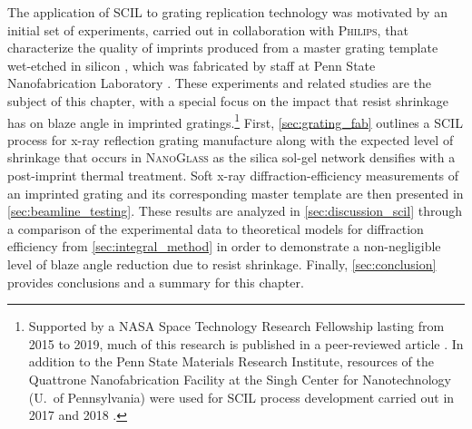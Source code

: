 The application of SCIL to grating replication technology was motivated by an initial set of experiments, carried out in collaboration with \textsc{Philips}, that characterize the quality of imprints produced from a master grating template wet-etched in silicon \cite{McCoy17}, which was fabricated by staff at Penn State Nanofabrication Laboratory \cite[\emph{cf.\@} \cref{sec:crystal_etching}]{Miles18,PSU_MRI_nanofab}. 
These experiments and related studies are the subject of this chapter, with a special focus on the impact that resist shrinkage has on blaze angle in imprinted gratings.\footnote{Supported by a NASA Space Technology Research Fellowship lasting from 2015 to 2019, much of this research is published in a peer-reviewed article \cite{McCoy20b}. In addition to the Penn State Materials Research Institute, resources of the Quattrone Nanofabrication Facility at the Singh Center for Nanotechnology \cite{Quattrone} (U.\ of Pennsylvania) were used for SCIL process development carried out in 2017 and 2018 \cite{McCoy17}.} 
First, \cref{sec:grating_fab} outlines a SCIL process for x-ray reflection grating manufacture along with the expected level of shrinkage that occurs in \textsc{NanoGlass} as the silica sol-gel network densifies with a post-imprint thermal treatment. 
Soft x-ray diffraction-efficiency measurements of an imprinted grating and its corresponding master template are then presented in \cref{sec:beamline_testing}. 
These results are analyzed in \cref{sec:discussion_scil} through a comparison of the experimental data to theoretical models for diffraction efficiency from \cref{sec:integral_method} in order to demonstrate a non-negligible level of blaze angle reduction due to resist shrinkage. 
Finally, \cref{sec:conclusion} provides conclusions and a summary for this chapter. 

